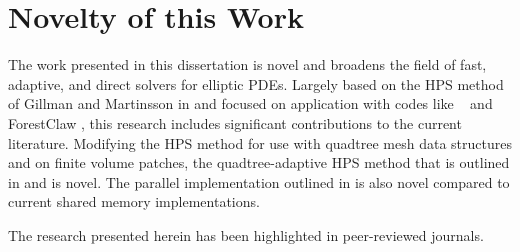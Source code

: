 \section{Novelty of this Work}

The work presented in this dissertation is novel and broadens the field of fast, adaptive, and direct solvers for elliptic PDEs. Largely based on the HPS method of Gillman and Martinsson in \cite{gillman2014direct,martinsson2019fast} and focused on application with codes like \pforest\ \cite{burstedde2011p4est,burstedde2020parallel} and ForestClaw \cite{calhoun2017forestclaw}, this research includes significant contributions to the current literature. Modifying the HPS method for use with quadtree mesh data structures and on finite volume patches, the quadtree-adaptive HPS method that is outlined in  and  is novel. The parallel implementation outlined in  is also novel compared to current shared memory implementations.

The research presented herein has been highlighted in peer-reviewed journals. 